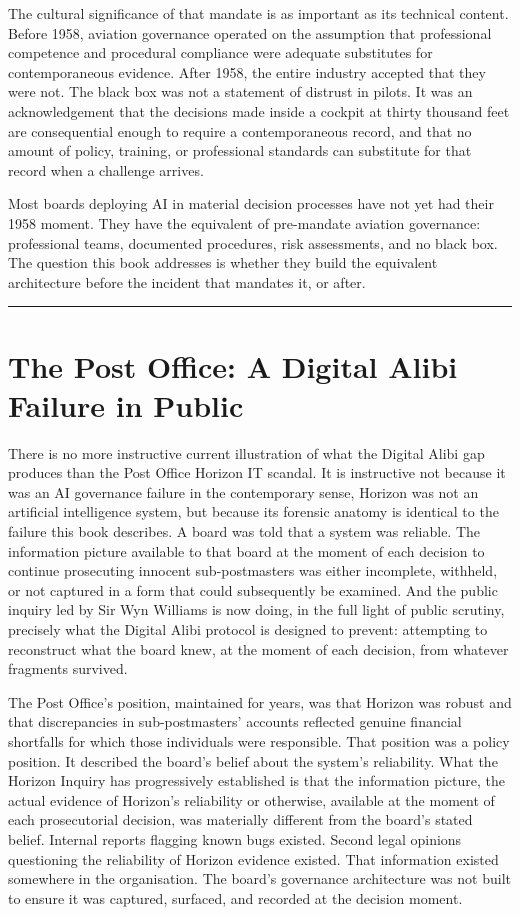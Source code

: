 The cultural significance of that mandate is as important as its technical content. Before 1958, aviation governance operated on the assumption that professional competence and procedural compliance were adequate substitutes for contemporaneous evidence. After 1958, the entire industry accepted that they were not. The black box was not a statement of distrust in pilots. It was an acknowledgement that the decisions made inside a cockpit at thirty thousand feet are consequential enough to require a contemporaneous record, and that no amount of policy, training, or professional standards can substitute for that record when a challenge arrives.

Most boards deploying AI in material decision processes have not yet had their 1958 moment. They have the equivalent of pre-mandate aviation governance: professional teams, documented procedures, risk assessments, and no black box. The question this book addresses is whether they build the equivalent architecture before the incident that mandates it, or after.

\begin{center}\rule{0.5\linewidth}{0.5pt}\end{center}

\section{The Post Office: A Digital Alibi Failure in Public}

There is no more instructive current illustration of what the Digital Alibi gap produces than the Post Office Horizon IT scandal. It is instructive not because it was an AI governance failure in the contemporary sense, Horizon was not an artificial intelligence system, but because its forensic anatomy is identical to the failure this book describes. A board was told that a system was reliable. The information picture available to that board at the moment of each decision to continue prosecuting innocent sub-postmasters was either incomplete, withheld, or not captured in a form that could subsequently be examined. And the public inquiry led by Sir Wyn Williams is now doing, in the full light of public scrutiny, precisely what the Digital Alibi protocol is designed to prevent: attempting to reconstruct what the board knew, at the moment of each decision, from whatever fragments survived.

The Post Office's position, maintained for years, was that Horizon was robust and that discrepancies in sub-postmasters' accounts reflected genuine financial shortfalls for which those individuals were responsible. That position was a policy position. It described the board's belief about the system's reliability. What the Horizon Inquiry has progressively established is that the information picture, the actual evidence of Horizon's reliability or otherwise, available at the moment of each prosecutorial decision, was materially different from the board's stated belief. Internal reports flagging known bugs existed. Second legal opinions questioning the reliability of Horizon evidence existed. That information existed somewhere in the organisation. The board's governance architecture was not built to ensure it was captured, surfaced, and recorded at the decision moment.

